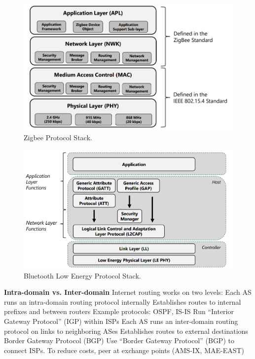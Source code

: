 \documentclass[11 pt]{scrartcl}
\begin{document}
\begin{figure}[!htb]
    \centering
    \includegraphics[scale=0.6]{assets/zigbee.png}
    \caption{Zigbee Protocol Stack.}
\end{figure}
\begin{figure}[!htb]
    \centering
    \includegraphics[scale=0.6]{assets/bluetooth_low_energy.png}
    \caption{Bluetooth Low Energy Protocol Stack.}
\end{figure}\newline
\textbf{Intra-domain vs. Inter-domain}\newline
Internet routing works on two levels:
\itemnum
    \ii Each AS runs an intra-domain routing protocol internally
    \itemnum
        \ii Establishes routes to internal prefixes and between routers
        \ii Example protocols: OSPF, IS-IS
        \ii Run “Interior Gateway Protocol” (IGP) within ISPs
    \itemend
    \ii Each AS runs an inter-domain routing protocol on links to neighboring ASes
    \itemnum
        \ii Establishes routes to external destinations
        \ii Border Gateway Protocol (BGP)
        \ii Use “Border Gateway Protocol” (BGP) to connect ISPs. To reduce costs, peer at exchange points (AMS-IX, MAE-EAST)
\end{document}
